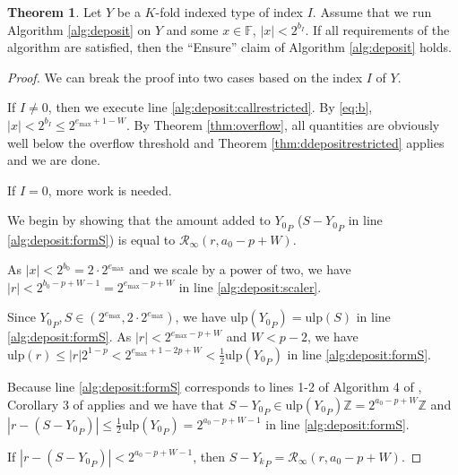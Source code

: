 \documentclass[12pt]{article}
\providecommand{\F}{\ensuremath{\mathbb{F}}}
\providecommand{\Z}{\ensuremath{\mathbb{Z}}}
\providecommand{\max}{\ensuremath{\text{max}}}
\providecommand{\ulp}{\ensuremath{\text{ulp}}}
\providecommand{\roundtonearestinfty}{\ensuremath{\mathcal{R}_\text{$\infty$}}}
\theoremstyle{definition}
\newtheorem{thm}{Theorem}[section]
\numberwithin{equation}{section}
\numberwithin{figure}{section}
\begin{document}
      \begin{samepage}
      \begin{thm}
        Let $Y$ be a $K$-fold indexed type of index $I$. Assume that we run Algorithm \ref{alg:deposit} on $Y$ and some $x \in \F$, $|x| < 2^{b_I}$. If all requirements of the algorithm are satisfied, then the ``Ensure'' claim of Algorithm \ref{alg:deposit} holds.
        \label{thm:ddeposit}
      \end{thm}
    \end{samepage}

      \begin{proof}
        We can break the proof into two cases based on the index $I$ of $Y$.

        If $I \neq 0$, then we execute line \ref{alg:deposit:callrestricted}. By  \eqref{eq:b}, $|x| < 2^{b_I} \leq 2^{e_{\max} + 1 - W}$. By Theorem \ref{thm:overflow}, all quantities are obviously well below the overflow threshold and Theorem \ref{thm:ddepositrestricted} applies and we are done.

        If $I = 0$, more work is needed.

        We begin by showing that the amount added to ${Y_0}_P$ ($S - {Y_0}_P$ in line \ref{alg:deposit:formS}) is equal to $\roundtonearestinfty(r, a_0 - p + W)$.

        As $|x| < 2^{b_0} = 2 \cdot 2^{e_{\max}}$ and we scale by a power of two, we have $|r| < 2^{b_0 - p + W - 1} = 2^{e_{\max} - p + W}$ in line \ref{alg:deposit:scaler}.

        Since ${Y_0}_P, S \in (2^{e_{\max}}, 2 \cdot 2^{e_{\max}})$, we have $\ulp({Y_0}_P) = \ulp(S)$ in line \ref{alg:deposit:formS}. As $|r| < 2^{e_{\max} - p + W}$ and $W < p - 2$, we have $\ulp(r) \leq |r| 2^{1 - p} < 2^{e_{\max} + 1 - 2p + W} < \frac{1}{2}\ulp({Y_0}_P)$ in line \ref{alg:deposit:formS}.

        Because line \ref{alg:deposit:formS} corresponds to lines 1-2 of Algorithm 4 of \cite{repsum}, Corollary 3 of \cite{repsum} applies and we have that $S - {Y_0}_P \in \ulp({Y_0}_P)\Z = 2^{a_0 - p + W}\Z$ and $|r - (S - {Y_0}_P)| \leq \frac{1}{2}  \ulp({Y_0}_P) = 2^{a_0 - p + W - 1}$ in line \ref{alg:deposit:formS}.

        If $|r - (S - {Y_0}_P)| < 2^{a_{0} - p + W - 1}$, then $S - {Y_k}_P = \roundtonearestinfty(r, a_{0} - p + W)$.


\end{proof}
\end{document}
